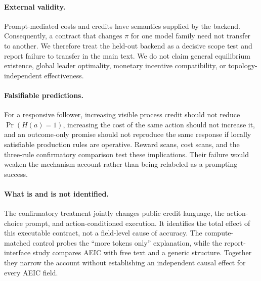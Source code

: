 \paragraph{External validity.}
Prompt-mediated costs and credits have semantics supplied by the backend. Consequently, a contract that changes $\pi$ for one model family need not transfer to another. We therefore treat the held-out backend as a decisive scope test and report failure to transfer in the main text. We do not claim general equilibrium existence, global leader optimality, monetary incentive compatibility, or topology-independent effectiveness.

\paragraph{Falsifiable predictions.}
For a responsive follower, increasing visible process credit should not reduce $\Pr(H(a)=1)$, increasing the cost of the same action should not increase it, and an outcome-only promise should not reproduce the same response if locally satisfiable production rules are operative. Reward scans, cost scans, and the three-rule confirmatory comparison test these implications. Their failure would weaken the mechanism account rather than being relabeled as a prompting success.

\paragraph{What is and is not identified.}
The confirmatory treatment jointly changes public credit language, the action-choice prompt, and action-conditioned execution. It identifies the total effect of this executable contract, not a field-level cause of accuracy. The compute-matched control probes the ``more tokens only'' explanation, while the report-interface study compares AEIC with free text and a generic structure. Together they narrow the account without establishing an independent causal effect for every AEIC field.

